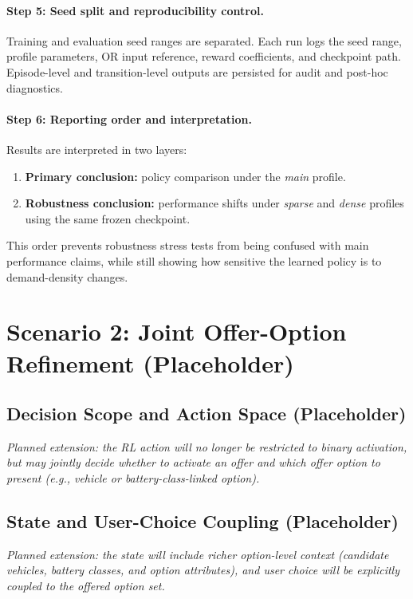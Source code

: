 \paragraph{Step 5: Seed split and reproducibility control.}
Training and evaluation seed ranges are separated.  
Each run logs the seed range, profile parameters, OR input reference, reward coefficients, and checkpoint path.  
Episode-level and transition-level outputs are persisted for audit and post-hoc diagnostics.

\paragraph{Step 6: Reporting order and interpretation.}
Results are interpreted in two layers:
\begin{enumerate}
\item \textbf{Primary conclusion:} policy comparison under the \textit{main} profile.
\item \textbf{Robustness conclusion:} performance shifts under \textit{sparse} and \textit{dense} profiles using the same frozen checkpoint.
\end{enumerate}

This order prevents robustness stress tests from being confused with main performance claims, while still showing how sensitive the learned policy is to demand-density changes.



\section{Scenario 2: Joint Offer-Option Refinement (Placeholder)}

\subsection{Decision Scope and Action Space (Placeholder)}

\textit{Planned extension: the RL action will no longer be restricted to binary activation, but may jointly decide whether to activate an offer and which offer option to present (e.g., vehicle or battery-class-linked option).}

\subsection{State and User-Choice Coupling (Placeholder)}

\textit{Planned extension: the state will include richer option-level context (candidate vehicles, battery classes, and option attributes), and user choice will be explicitly coupled to the offered option set.}

